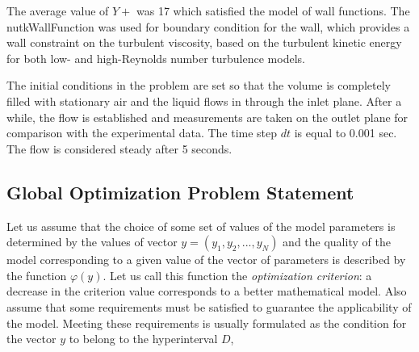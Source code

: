 \documentclass[mathematics,article,submit,pdftex,moreauthors]{Definitions/mdpi}
\begin{document}
The average value of $Y+$ was 17 which satisfied the model of wall functions. The nutkWallFunction was used for boundary condition for the wall, which provides a wall constraint on the turbulent viscosity, based on the turbulent kinetic energy for both low- and high-Reynolds number turbulence models.


The initial conditions in the problem are set so that the volume is completely filled with stationary air and the liquid flows in through the inlet plane. After a while, the flow is established and measurements are taken on the outlet plane for comparison with the experimental data. The time step $dt$ is equal to 0.001 sec. The flow is considered steady after 5 seconds.















\subsection{Global Optimization Problem Statement}
Let us assume that the choice of some set of values of the model parameters is determined by the values of vector $y=(y_1,y_2,...,y_N)$ and the quality of the model corresponding to a given value of the vector of parameters is described by the function $\varphi(y)$. Let us call this function the \textit{optimization criterion}: a decrease in the criterion value corresponds to a better mathematical model. Also assume that some requirements must be satisfied to guarantee the applicability of the model. Meeting these requirements is usually formulated as the condition for the vector $y$ to belong to the hyperinterval $D$,
\end{document}
